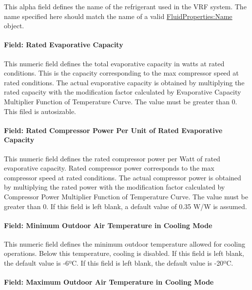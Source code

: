 This alpha field defines the name of the refrigerant used in the VRF system. The name specified here should match the name of a valid \hyperref[fluidpropertiesname]{FluidProperties:Name} object.

\paragraph{Field: Rated Evaporative Capacity}\label{field-rated-evaporative-capacity}

This numeric field defines the total evaporative capacity in watts at rated conditions. This is the capacity corresponding to the max compressor speed at rated conditions. The actual evaporative capacity is obtained by multiplying the rated capacity with the modification factor calculated by Evaporative Capacity Multiplier Function of Temperature Curve. The value must be greater than 0. This filed is autosizable.

\paragraph{Field: Rated Compressor Power Per Unit of Rated Evaporative Capacity}\label{field-rated-compressor-power-per-unit-of-rated-evaporative-capacity}

This numeric field defines the rated compressor power per Watt of rated evaporative capacity. Rated compressor power corresponds to the max compressor speed at rated conditions. The actual compressor power is obtained by multiplying the rated power with the modification factor calculated by Compressor Power Multiplier Function of Temperature Curve. The value must be greater than 0. If this field is left blank, a default value of 0.35 W/W is assumed.

\paragraph{Field: Minimum Outdoor Air Temperature in Cooling Mode}\label{field-minimum-outdoor-air-temperature-in-cooling-mode}

This numeric field defines the minimum outdoor temperature allowed for cooling operations. Below this temperature, cooling is disabled. If this field is left blank, the default value is -6ºC.
 If this field is left blank, the default value is -20ºC.

\paragraph{Field: Maximum Outdoor Air Temperature in Cooling Mode}\label{field-maximum-outdoor-air-temperature-in-cooling-mode}

